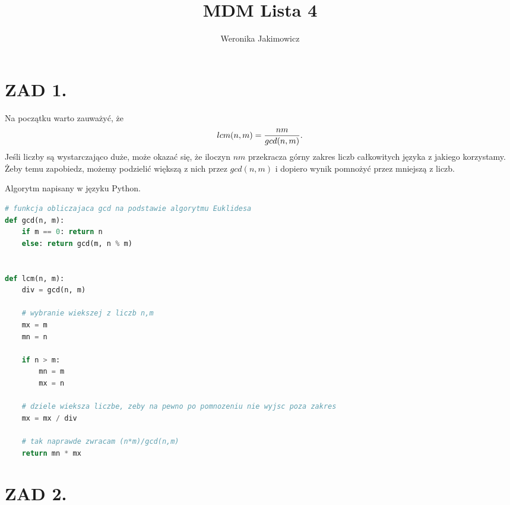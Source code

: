 \documentclass{article}[13pt]
\author{Weronika Jakimowicz}
\title{MDM Lista 4}
\date{}
\begin{document}
\maketitle




        

\section*{ZAD 1.}

Na początku warto zauważyć, że
$$lcm(n,m)={nm\over gcd(n,m)}.$$
Jeśli liczby są wystarczająco duże, może okazać się, że iloczyn $nm$ przekracza górny zakres liczb całkowitych języka z jakiego korzystamy. Żeby temu zapobiedz, możemy podzielić większą z nich przez $gcd(n,m)$ i dopiero wynik pomnożyć przez mniejszą z liczb.

Algorytm napisany w języku Python.

\begin{lstlisting}[language=Python]
# funkcja obliczajaca gcd na podstawie algorytmu Euklidesa
def gcd(n, m):
    if m == 0: return n
    else: return gcd(m, n % m)


def lcm(n, m):
    div = gcd(n, m)

    # wybranie wiekszej z liczb n,m
    mx = m
    mn = n

    if n > m:
        mn = m
        mx = n

    # dziele wieksza liczbe, zeby na pewno po pomnozeniu nie wyjsc poza zakres
    mx = mx / div

    # tak naprawde zwracam (n*m)/gcd(n,m)
    return mn * mx
\end{lstlisting}

\section*{ZAD 2.}
\end{document}
